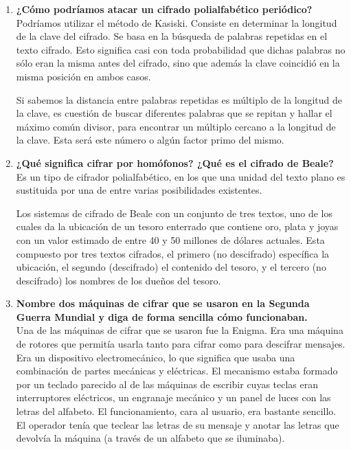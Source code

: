 \documentclass{article}
\begin{document}
\begin{enumerate}
    \item \textbf{¿Cómo podríamos atacar un cifrado polialfabético periódico?}\\
    Podríamos utilizar el método de Kasiski. Consiste en determinar la longitud de la clave del cifrado. Se basa en la búsqueda de palabras repetidas en el texto cifrado. Esto significa casi con toda probabilidad que dichas palabras no sólo eran la misma antes del cifrado, sino que además la clave coincidió en la misma posición en ambos casos. 
    
    Si sabemos la distancia entre palabras repetidas es múltiplo de la longitud de la clave, es cuestión de buscar diferentes palabras que se repitan y hallar el máximo común divisor, para encontrar un múltiplo cercano a la longitud de la clave. Esta será este número o algún factor primo del mismo. 

    
    
    \item \textbf{¿Qué significa cifrar por homófonos? ¿Qué es el cifrado de Beale?}\\
    Es un tipo de cifrador polialfabético, en los que una unidad del texto plano es sustituida por una de entre varias posibilidades existentes.
    
    Los sistemas de cifrado de Beale con un conjunto de tres textos, uno de los cuales da la ubicación de un tesoro enterrado que contiene oro, plata y joyas con un valor estimado de entre 40 y 50 millones de dólares actuales. Esta compuesto por tres textos cifrados, el primero (no descifrado) específica la ubicación, el segundo (descifrado) el contenido del tesoro, y el tercero (no descifrado) los nombres de los dueños del tesoro.
    
    \item \textbf{Nombre dos máquinas de cifrar que se usaron en la Segunda Guerra Mundial y diga de forma sencilla cómo funcionaban.}\\
    Una de las máquinas de cifrar que se usaron fue la Enigma. Era una máquina de rotores que permitía usarla tanto para cifrar como para descifrar mensajes. Era un dispositivo electromecánico, lo que significa que usaba una combinación de partes mecánicas y eléctricas. El mecanismo estaba formado por un teclado parecido al de las máquinas de escribir cuyas teclas eran interruptores eléctricos, un engranaje mecánico y un panel de luces con las letras del alfabeto. El funcionamiento, cara al usuario, era bastante sencillo. El operador tenía que teclear las letras de su mensaje y anotar las letras que devolvía la máquina (a través de un alfabeto que se iluminaba).\\
    

\end{enumerate}
\end{document}

